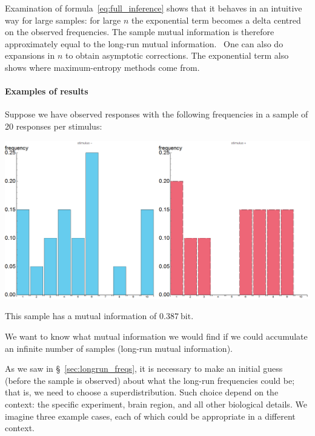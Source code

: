 \documentclass[\ifafour a4paper,12pt,\else a5paper,10pt,\fi%
onecolumn,oneside,article,%
british%
]{memoir}
\theoremstyle{remark}
\theoremstyle{innote}
\renewcommand*{\|}[1][]{\nonscript\,#1\vert\nonscript\;\mathopen{}}
\renewcommand*{\=}{\TextOrMath\texteq\eq}
\newcommand*{\sect}{\S}%
\newcommand*{\puzzle}{{\fontencoding{U}\fontfamily{fontawesometwo}\selectfont\symbol{225}}}
\newcommand{\mynote}[1]{ {\color{notecolour}\puzzle\ #1}}
\newcommand*{\bit}{\mathrm{bit}}
\begin{document}
Examination of formula~\eqref{eq:full_inference} shows that it behaves in
an intuitive way for large samples: for large $n$ the exponential term
becomes a delta centred on the observed frequencies. The sample mutual
information is therefore approximately equal to the long-run mutual
information. \mynote{One can also do expansions in $n$ to obtain asymptotic
  corrections. The exponential term also shows where maximum-entropy
  methods come from.}


\paragraph{Examples of results}

Suppose we have observed responses with the following frequencies in a
sample of 20 responses per stimulus:
\begin{center}%
\includegraphics[width=\linewidth]{scripts/example1.png}%
\end{center}%
This sample has a mutual information of $0.387\:\bit$.

We want to know what mutual information we would find if we could
accumulate an infinite number of samples (long-run mutual information).

As we saw in \sect~\ref{sec:longrun_freqs}, it is necessary to make an
initial guess (before the sample is observed) about what the long-run
frequencies could be; that is, we need to choose a superdistribution. Such
choice depend on the context: the specific experiment, brain region, and
all other biological details. We imagine three example cases, each of which
could be appropriate in a different context.
\end{document}
